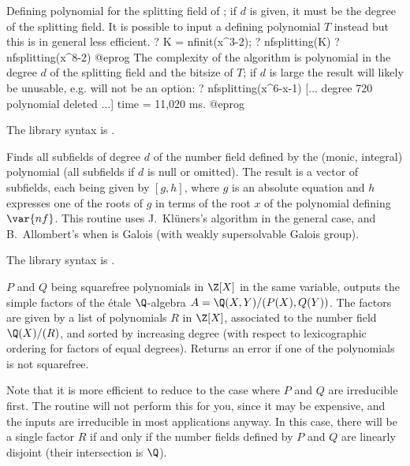 \label{se:nfsplitting}
Defining polynomial for the splitting field of ;
if $d$ is given, it must be the degree of the splitting field. It
is possible to input a defining polynomial $T$ instead but this is in
general less efficient.
\bprog
? K = nfinit(x^3-2);
? nfsplitting(K)
?  nfsplitting(x^8-2)
@eprog\noindent
The complexity of the algorithm is polynomial in the degree $d$ of the
splitting field and the bitsize of $T$; if $d$ is large the result will
likely be unusable, e.g.  will not be an option:
\bprog
? nfsplitting(x^6-x-1)
[... degree 720 polynomial deleted ...]
time = 11,020 ms.
@eprog

The library syntax is .

\label{se:nfsubfields}
Finds all subfields of degree
$d$ of the number field defined by the (monic, integral) polynomial
 (all subfields if $d$ is null or omitted). The result is a vector
of subfields, each being given by $[g,h]$, where $g$ is an absolute equation
and $h$ expresses one of the roots of $g$ in terms of the root $x$ of the
polynomial defining $\var{nf}$. This routine uses J.~Kl\"uners's algorithm
in the general case, and B.~Allombert's  when 
is Galois (with weakly supersolvable Galois group).

The library syntax is .

\label{se:polcompositum}
 $P$ and $Q$
being squarefree polynomials in $\Z[X]$ in the same variable, outputs
the simple factors of the \'etale $\Q$-algebra $A = \Q(X, Y) / (P(X), Q(Y))$.
The factors are given by a list of polynomials $R$ in $\Z[X]$, associated to
the number field $\Q(X)/ (R)$, and sorted by increasing degree (with respect
to lexicographic ordering for factors of equal degrees). Returns an error if
one of the polynomials is not squarefree.

Note that it is more efficient to reduce to the case where $P$ and $Q$ are
irreducible first. The routine will not perform this for you, since it may be
expensive, and the inputs are irreducible in most applications anyway. In
this case, there will be a single factor $R$ if and only if the number
fields defined by $P$ and $Q$ are linearly disjoint (their intersection is
$\Q$).

